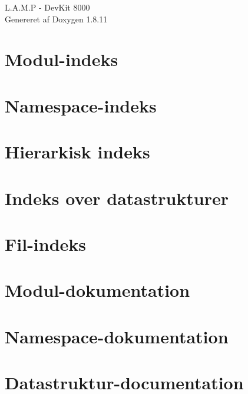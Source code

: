 \documentclass[twoside]{article}
\newcommand{\+}{\discretionary{\mbox{\scriptsize$\hookleftarrow$}}{}{}}
\begin{document}
\hypersetup{pageanchor=false,
             bookmarksnumbered=true,
             pdfencoding=unicode
            }
\begin{titlepage}
\vspace*{7cm}
\begin{center}%
{\Large L.\+A.\+M.\+P -\/ Dev\+Kit 8000 }\\
\vspace*{1cm}
{\large Genereret af Doxygen 1.8.11}\\
\end{center}
\end{titlepage}
\tableofcontents
{}
\hypersetup{pageanchor=true}

\section{Modul-\/indeks}

\section{Namespace-\/indeks}

\section{Hierarkisk indeks}

\section{Indeks over datastrukturer}

\section{Fil-\/indeks}

\section{Modul-\/dokumentation}

\section{Namespace-\/dokumentation}

\section{Datastruktur-\/documentation}















\end{document}
